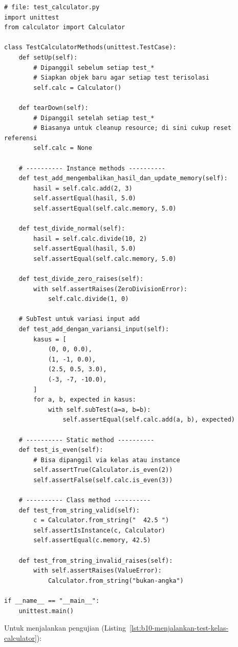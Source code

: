 \begin{lstlisting}[style=PythonStyle, caption={Pengujian method kelas dengan unittest}, label={lst:test-method}]
# file: test_calculator.py
import unittest
from calculator import Calculator

class TestCalculatorMethods(unittest.TestCase):
    def setUp(self):
        # Dipanggil sebelum setiap test_*
        # Siapkan objek baru agar setiap test terisolasi
        self.calc = Calculator()

    def tearDown(self):
        # Dipanggil setelah setiap test_*
        # Biasanya untuk cleanup resource; di sini cukup reset referensi
        self.calc = None

    # ---------- Instance methods ----------
    def test_add_mengembalikan_hasil_dan_update_memory(self):
        hasil = self.calc.add(2, 3)
        self.assertEqual(hasil, 5.0)
        self.assertEqual(self.calc.memory, 5.0)

    def test_divide_normal(self):
        hasil = self.calc.divide(10, 2)
        self.assertEqual(hasil, 5.0)
        self.assertEqual(self.calc.memory, 5.0)

    def test_divide_zero_raises(self):
        with self.assertRaises(ZeroDivisionError):
            self.calc.divide(1, 0)

    # SubTest untuk variasi input add
    def test_add_dengan_variansi_input(self):
        kasus = [
            (0, 0, 0.0),
            (1, -1, 0.0),
            (2.5, 0.5, 3.0),
            (-3, -7, -10.0),
        ]
        for a, b, expected in kasus:
            with self.subTest(a=a, b=b):
                self.assertEqual(self.calc.add(a, b), expected)

    # ---------- Static method ----------
    def test_is_even(self):
        # Bisa dipanggil via kelas atau instance
        self.assertTrue(Calculator.is_even(2))
        self.assertFalse(self.calc.is_even(3))

    # ---------- Class method ----------
    def test_from_string_valid(self):
        c = Calculator.from_string("  42.5 ")
        self.assertIsInstance(c, Calculator)
        self.assertEqual(c.memory, 42.5)

    def test_from_string_invalid_raises(self):
        with self.assertRaises(ValueError):
            Calculator.from_string("bukan-angka")

if __name__ == "__main__":
    unittest.main()
\end{lstlisting}

Untuk menjalankan pengujian (Listing~\ref{lst:b10-menjalankan-test-kelas-calculator}):


